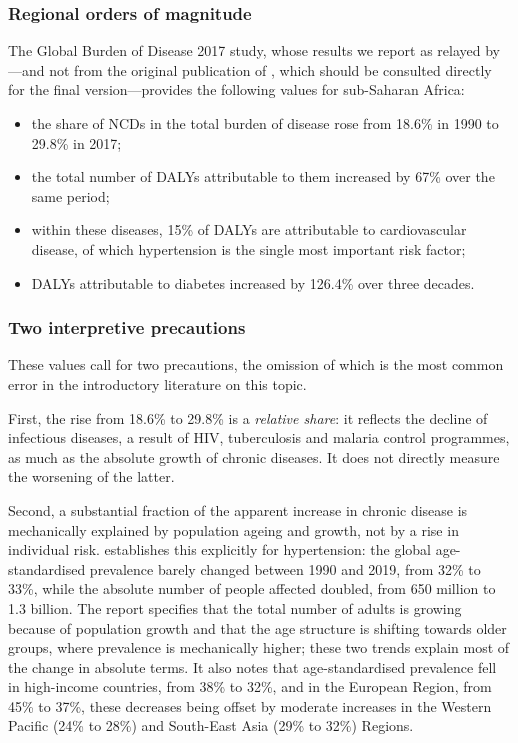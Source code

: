 \documentclass[12pt,a4paper,oneside]{report}
\begin{document}
\subsubsection{Regional orders of magnitude}

The Global Burden of Disease 2017 study, whose results we report as relayed by \textcite{nagavci2022}---and not from the original publication of \textcite{gouda2019}, which should be consulted directly for the final version---provides the following values for sub-Saharan Africa:
\begin{itemize}[nosep]
  \item the share of NCDs in the total burden of disease rose from 18.6\% in 1990 to 29.8\% in 2017;
  \item the total number of DALYs attributable to them increased by 67\% over the same period;
  \item within these diseases, 15\% of DALYs are attributable to cardiovascular disease, of which hypertension is the single most important risk factor;
  \item DALYs attributable to diabetes increased by 126.4\% over three decades.
\end{itemize}

\subsubsection{Two interpretive precautions}

These values call for two precautions, the omission of which is the most common error in the introductory literature on this topic.

First, the rise from 18.6\% to 29.8\% is a \emph{relative share}: it reflects the decline of infectious diseases, a result of HIV, tuberculosis and malaria control programmes, as much as the absolute growth of chronic diseases. It does not directly measure the worsening of the latter.

Second, a substantial fraction of the apparent increase in chronic disease is mechanically explained by population ageing and growth, not by a rise in individual risk. \textcite{who2023hypertension} establishes this explicitly for hypertension: the global age-standardised prevalence barely changed between 1990 and 2019, from 32\% to 33\%, while the absolute number of people affected doubled, from 650 million to 1.3 billion. The report specifies that the total number of adults is growing because of population growth and that the age structure is shifting towards older groups, where prevalence is mechanically higher; these two trends explain most of the change in absolute terms. It also notes that age-standardised prevalence fell in high-income countries, from 38\% to 32\%, and in the European Region, from 45\% to 37\%, these decreases being offset by moderate increases in the Western Pacific (24\% to 28\%) and South-East Asia (29\% to 32\%) Regions.
\end{document}
